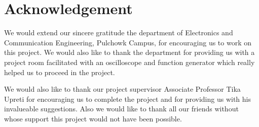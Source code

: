 \section*{Acknowledgement}
We would extend our sincere gratitude the department of Electronics and Communication Engineering, Pulchowk Campus, for encouraging us to work on this project. We would also like to thank the department for providing us with a project room facilitated with an oscilloscope and function generator which really helped us to proceed in the project.

We would also like to thank our project supervisor Associate Professor Tika Upreti for encouraging us to complete the project and for providing us with his invalueable suggestions. Also we would like to thank all our friends without whose support this project would not have been possible.

